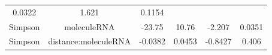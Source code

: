 \documentclass[]{article}
\begin{document}
\begin{longtable}[]{@{}cccccc@{}}
\begin{minipage}[t]{0.14\columnwidth}
0.0322\strut
\end{minipage} & \begin{minipage}[t]{0.12\columnwidth}\centering\strut
1.621\strut
\end{minipage} & \begin{minipage}[t]{0.09\columnwidth}\centering\strut
0.1154\strut
\end{minipage}\tabularnewline
\begin{minipage}[t]{0.12\columnwidth}\centering\strut
Simpson\strut
\end{minipage} & \begin{minipage}[t]{0.24\columnwidth}\centering\strut
moleculeRNA\strut
\end{minipage} & \begin{minipage}[t]{0.11\columnwidth}\centering\strut
-23.75\strut
\end{minipage} & \begin{minipage}[t]{0.14\columnwidth}\centering\strut
10.76\strut
\end{minipage} & \begin{minipage}[t]{0.12\columnwidth}\centering\strut
-2.207\strut
\end{minipage} & \begin{minipage}[t]{0.09\columnwidth}\centering\strut
0.0351\strut
\end{minipage}\tabularnewline
\begin{minipage}[t]{0.12\columnwidth}\centering\strut
Simpson\strut
\end{minipage} & \begin{minipage}[t]{0.24\columnwidth}\centering\strut
distance:moleculeRNA\strut
\end{minipage} & \begin{minipage}[t]{0.11\columnwidth}\centering\strut
-0.0382\strut
\end{minipage} & \begin{minipage}[t]{0.14\columnwidth}\centering\strut
0.0453\strut
\end{minipage} & \begin{minipage}[t]{0.12\columnwidth}\centering\strut
-0.8427\strut
\end{minipage} & \begin{minipage}[t]{0.09\columnwidth}\centering\strut
0.406\strut
\end{minipage}\tabularnewline
\bottomrule
\end{longtable}
\end{document}
